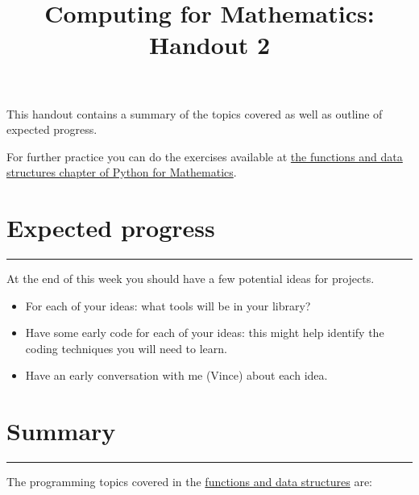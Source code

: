 \documentclass{article}
\title{Computing for Mathematics: Handout 2}
\date{}
\begin{document}
\maketitle


This handout contains a summary of the topics covered as well as outline of
expected progress.

For further practice you can do the exercises available at 
\href{https://vknight.org/pfm/building-tools/02-functions-and-data-structures/exercises/main.html}{the
functions and data structures chapter of Python for Mathematics}.

\section{Expected progress}
\hrule

At the end of this week you should have a few potential ideas for projects.

\begin{itemize}
    \item For each of your ideas: what tools will be in your library?
    \item Have some early code for each of your ideas: this might help identify
        the coding techniques you will need to learn.
    \item Have an early conversation with me (Vince) about each idea.
\end{itemize}

\begin{center}
\end{center}

\section{Summary}\label{summary}
\hrule

The programming topics covered in the
\href{https://vknight.org/pfm/building-tools/02-functions-and-data-structures/introduction/main.html}{functions
and data structures} are:

\end{document}

